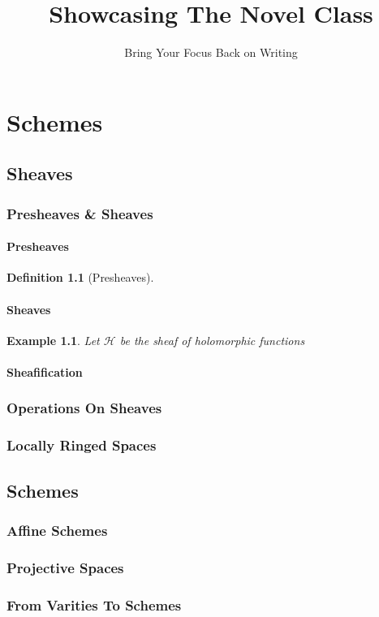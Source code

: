 \documentclass{novel}
\title     {Showcasing The Novel Class}
\subtitle  {Bring Your Focus Back on Writing}
\newtheorem{definition}{Definition}
\newtheorem{example}{Example}
\begin{document}
\toc

\part{Schemes}

\chapter{Sheaves}

\section{Presheaves \& Sheaves}

\subsection{Presheaves}

\begin{definition}[Presheaves]
    
\end{definition}


\subsection{Sheaves}

\begin{example}
    Let $ \mathscr{H} $ be the sheaf of holomorphic functions 
\end{example}

\subsection{Sheafification}


\section{Operations On Sheaves}

\section{Locally Ringed Spaces}

\chapter{Schemes}

\section{Affine Schemes}

\section{Projective Spaces}

\section{From Varities To Schemes} 
\end{document}
